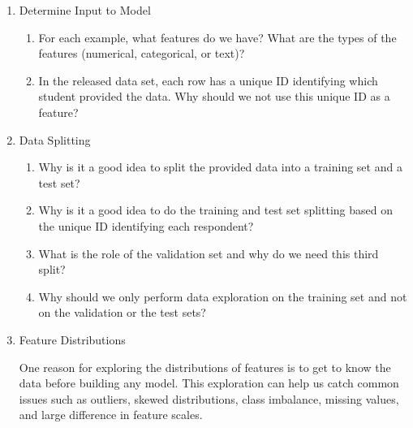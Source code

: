 \documentclass[12pt]{article}
\begin{document}
\begin{enumerate}

\item Determine Input to Model

\begin{enumerate}

\item For each example, what features do we have? What are the types of the features
  (numerical, categorical, or text)?

\item In the released data set, each row has a unique ID identifying which student
  provided the data. Why should we not use this unique ID as a feature?


\end{enumerate}

\item Data Splitting

\begin{enumerate}

\item Why is it a good idea to split the provided data into a training set and a test
  set?

\item Why is it a good idea to do the training and test set splitting based on the
  unique ID identifying each respondent?

\item What is the role of the validation set and why do we need this third split?

\item Why should we only perform data exploration on the training set and not on the
  validation or the test sets?

\end{enumerate}

\item Feature Distributions

\smallskip
One reason for exploring the distributions of features is to get to know the data before
building any model. This exploration can help us catch common issues such as outliers,
skewed distributions, class imbalance, missing values, and large difference in feature
scales.

\smallskip
\begin{enumerate}


\end{enumerate}
\end{enumerate}
\end{document}
